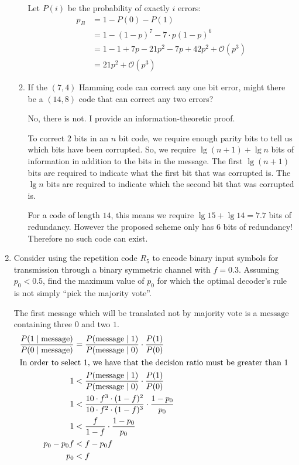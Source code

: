 \documentclass[10pt,\jkfside,a4paper]{article}
\begin{document}
\begin{enumerate}
\begin{enumerate}
        Let $P(i)$ be the probability of exactly $i$ errors:
        \begin{align*}
            p_B
            &= 1 - P(0) - P(1) \\
            &= 1 - (1 - p)^7 - 7 \cdot p(1 - p)^6 \\
            &= 1 - 1 + 7p - 21p^2 - 7p + 42p^2 + \mathcal O(p^3) \\
            &= 21p^2 + \mathcal O(p^3)
        \end{align*}

        \item If the $(7, 4)$ Hamming code can correct any one bit error, might there be a $(14, 8)$ code that can correct any two errors?

        No, there is not. I provide an information-theoretic proof.

        To correct 2 bits in an $n$ bit code, we require enough parity bits to tell us which bits have been corrupted. So, we require $\lg (n + 1) + \lg n$ bits of information in addition to the bits in the message. The first $\lg(n + 1)$ bits are required to indicate what the first bit that was corrupted is. The $\lg n$ bits are required to indicate which the second bit that was corrupted is.

        For a code of length $14$, this means we require $\lg 15 + \lg 14 = 7.7$ bits of redundancy. However the proposed scheme only has $6$ bits of redundancy! Therefore no such code can exist.

    \end{enumerate}

    \item Consider using the repetition code $R_5$ to encode binary input symbols for transmission through a binary symmetric channel with $f = 0.3$. Assuming $p_0 < 0.5$, find the maximum value of $p_0$ for
    which the optimal decoder's rule is not simply ``pick the majority vote''.

    The first message which will be translated not by majority vote is a $\mathrm{message}$ containing three $0$ and two $1$.
    \begin{align}
        \frac{P(1 \mid \mathrm{message})}{P(0 \mid \mathrm{message})} &= \frac{P(\mathrm{message} \mid 1)}{P(\mathrm{message} \mid 0)} \cdot \frac{P(1)}{P(0)} \\
        \intertext{In order to select $1$, we have that the decision ratio must be greater than 1}
        1 &< \frac{P(\mathrm{message} \mid 1)}{P(\mathrm{message} \mid 0)} \cdot \frac{P(1)}{P(0)} \\
        1 &< \frac{10 \cdot f^3 \cdot (1 - f)^2}{10 \cdot f^2 \cdot (1 - f)^3} \cdot \frac{1 - p_0}{p_0} \\
        1 &< \frac{f}{1 - f} \cdot \frac{1 - p_0}{p_0} \\
        p_0 - p_0 f &< f - p_0 f \\
        p_0 &< f
    \end{align}


\end{enumerate}
\end{document}
